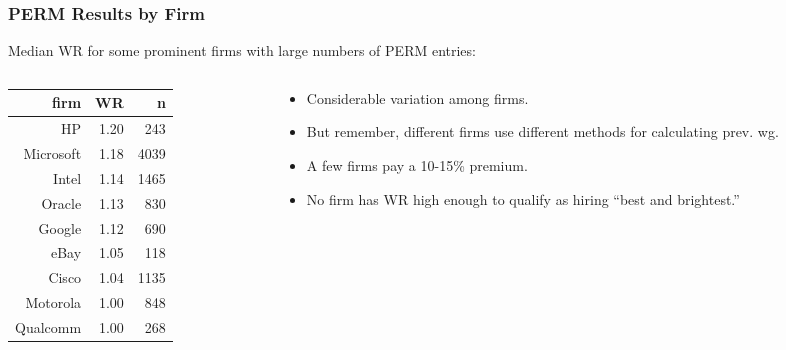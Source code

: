 \documentclass{beamer}
\begin{document}
\begin{frame}
\frametitle{PERM Results by Firm}
\pause

Median WR for some prominent firms with large numbers of PERM entries:
\pause

\bigskip

\begin{columns}

   \begin{column}{0.5\textwidth}
   \begin{tabular}{|r|r|r|}
   \hline
   firm & WR & n \\ \hline
   \hline
   HP & 1.20 & 243 \\ \hline
   Microsoft & 1.18 & 4039 \\ \hline
   Intel & 1.14 & 1465 \\ \hline
   Oracle & 1.13 & 830 \\ \hline
   Google & 1.12 & 690 \\ \hline
   eBay & 1.05 & 118 \\ \hline
   Cisco & 1.04 & 1135 \\ \hline
   Motorola & 1.00 & 848 \\ \hline
   Qualcomm & 1.00 & 268 \\ \hline
   \end{tabular}
   \pause
   \end{column}

   \begin{column}{0.5\textwidth}

   \begin{itemize}
   
   \item Considerable variation among firms.  \pause

   \item But remember, different firms use different methods for
   calculating prev. wg. \pause
   
   \item A few firms pay a 10-15\% premium.  \pause
   
   \item No firm has WR high enough to qualify as hiring ``best and
   brightest.''
   
   \end{itemize} \end{column}

\end{columns}

\end{frame}
\end{document}
